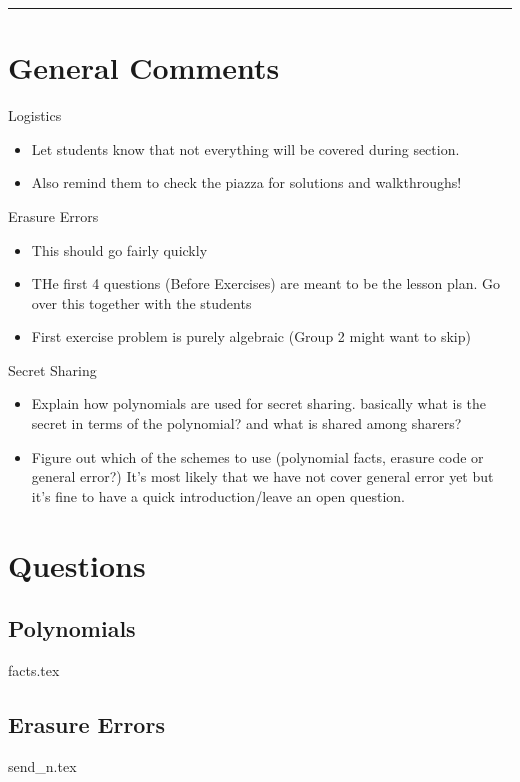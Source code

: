 \documentclass{exam}
\title{}
\date{Polynomials, Secret Sharing, Erasure Errors, General Errors, Self Reference}
\begin{document}
\maketitle
\rule{\textwidth}{0.15em}
\fontsize{12}{15}\selectfont
\thispagestyle{empty}


\section{General Comments}
\begin{questions}
\item Logistics
\begin{itemize}
\item Let students know that not everything will be covered during section. 
\item Also remind them to check the piazza for solutions and walkthroughs!
\end{itemize}
\item Erasure Errors
\begin{itemize}
\item This should go fairly quickly
\item THe first 4 questions (Before Exercises) are meant to be the lesson plan. Go over this together with the students
\item First exercise problem is purely algebraic (Group 2 might want to skip)
\end{itemize}

\item Secret Sharing
\begin{itemize}
\item Explain how polynomials are used for secret sharing. basically what is the secret in terms of the polynomial? and what is shared among sharers?
\item Figure out which of the schemes to use (polynomial facts, erasure code or general error?) It's most likely that we have not cover general error yet but it's fine to have a quick introduction/leave an open question.
\end{itemize}

\end{questions}

\section{Questions}
\subsection{Polynomials}
\begin{enumerate}
{facts.tex}
\end{enumerate}

\subsection{Erasure Errors}
\begin{enumerate}
{send_n.tex}
\end{enumerate}
\end{document}
